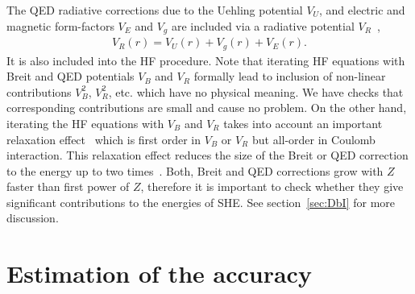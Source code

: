 \documentclass[10pt,a4paper, twoside]{report}
\begin{document}
The QED radiative corrections due to the Uehling potential $V_U$, and electric and magnetic form-factors 
$V_E $ and $ V_g$  are included via a radiative potential $V_R$~\cite{FG2005},
\begin{align}\label{eq:VR}
V_{R}(r) = V_{U}(r) + V_{g}(r) + V_{E}(r).
\end{align}
It is also included into the HF procedure.
Note that iterating  HF equations with Breit and QED potentials $V_B$ and $V_R$ formally lead to inclusion of non-linear
contributions  $V_B^2$, $V_R^2$, etc. which have no physical meaning. We have checks that corresponding contributions
are small and cause no problem. On the other hand, iterating the HF equations with $V_B$ and $V_R$ takes into account
an important relaxation effect~\cite{DF2016} which is first order in $V_B$ or $V_R$ but all-order in Coulomb interaction.
This relaxation effect reduces the size of the Breit or QED correction to the energy up to two times~\cite{DF2016}.
Both, Breit and QED corrections grow with $Z$ faster than first power of $Z$, therefore it is important to check whether
they give significant contributions to the energies of SHE. See section~\ref{sec:DbI} for more discussion. 
\section{Estimation of the accuracy} \label{sec:Accuracy}
\end{document}
